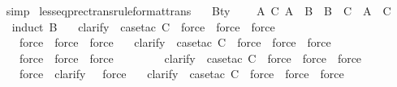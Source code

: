 \begin{isabellebody}
\ \endisadelimproof
\isatagproof
{}\isamarkupfalse \ simp\endisatagproof
{\isafoldproof}\isadelimproof
\endisadelimproof
\isanewline
\isanewline
{}\isamarkupfalse \ lesseq{\isacharunderscore}prec{\isacharunderscore}trans{\isacharbrackleft}rule{\isacharunderscore}format{\isacharcomma}trans{\isacharbrackright}{\isacharcolon}\isanewline
\ \ \ B{\isacharcolon}{\isacharcolon}ty\isanewline
\ \ \ {\isachardoublequoteopen}{\isacharparenleft}{\isasymforall}\ A\ C{\isachardot}\ A\ {\isasymsqsubseteq}\ B\ {\isasymlongrightarrow}\ B\ {\isasymsqsubseteq}\ C\ {\isasymlongrightarrow}\ A\ {\isasymsqsubseteq}\ C{\isacharparenright}{\isachardoublequoteclose}\isanewline
\isadelimproof
\ \ \endisadelimproof
\isatagproof
{}\isamarkupfalse \ {\isacharparenleft}induct\ B{\isacharparenright}\isanewline
\ \ \isamarkupfalse \ clarify\ \isamarkupfalse \ {\isacharparenleft}case{\isacharunderscore}tac\ C{\isacharparenright}\ \isamarkupfalse \ force\ \isamarkupfalse \ force\ \isamarkupfalse \ force\isanewline
\ \ \ \ \isamarkupfalse \ force\ \isamarkupfalse \ force\ \isamarkupfalse \ force\isanewline
\ \ \isamarkupfalse \ clarify\ \isamarkupfalse \ {\isacharparenleft}case{\isacharunderscore}tac\ C{\isacharparenright}\ \isamarkupfalse \ force\ \isamarkupfalse \ force\ \isamarkupfalse \ force\isanewline
\ \ \ \ \isamarkupfalse \ force\ \isamarkupfalse \ force\ \isamarkupfalse \ force\isanewline
\ \ \isamarkupfalse \isanewline
\ \ \isamarkupfalse \isanewline
\ \ \isamarkupfalse \ clarify\ \isamarkupfalse \ {\isacharparenleft}case{\isacharunderscore}tac\ C{\isacharparenright}\ \isamarkupfalse \ force\ \isamarkupfalse \ force\ \isamarkupfalse \ force\isanewline
\ \ \ \ \isamarkupfalse \ force\ \isamarkupfalse \ clarify\ \isamarkupfalse \ \isamarkupfalse \ force\isanewline
\ \ \isamarkupfalse \ clarify\ \isamarkupfalse \ {\isacharparenleft}case{\isacharunderscore}tac\ C{\isacharparenright}\ \isamarkupfalse \ force\ \isamarkupfalse \ force\ \isamarkupfalse \ force\isanewline

\end{isabellebody}
